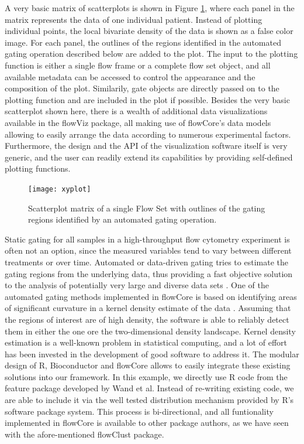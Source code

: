 \documentclass[12pt]{article}
\begin{document}
A very basic matrix of scatterplots is shown in Figure \ref{xyplot},
where each panel in the matrix represents the data of one individual
patient. Instead of plotting individual points, the local bivariate
density of the data is shown as a false color image. For each panel,
the outlines of the regions identified in the automated gating
operation described below are added to the plot. The input to the
plotting function is either a single flow frame or a complete flow set
object, and all available metadata can be accessed to control the
appearance and the composition of the plot. Similarily, gate objects
are directly passed on to the plotting function and are included in
the plot if possible. Besides the very basic scatterplot shown here,
there is a wealth of additional data visualizations available in the
flowViz package\cite{sarkar2008ufv}, all making use of flowCore's data
models allowing to easily arrange the data according to numerous
experimental factors. Furthermore, the design and the API of the
visualization software itself is very generic, and the user can
readily extend its capabilities by providing self-defined plotting
functions.

\begin{figure}[htbp]
\centering
\texttt{[image: xyplot]}
\caption{\label{xyplot}%
Scatterplot matrix of a single Flow Set with outlines of the gating
regions identified by an automated gating operation.}
\end{figure}

Static gating for all samples in a high-throughput flow cytometry
experiment is often not an option, since the measured variables tend
to vary between different treatments or over time. Automated or
data-driven gating tries to estimate the gating regions from the
underlying data, thus providing a fast objective solution to the
analysis of potentially very large and diverse data sets
\cite{lo2008agf}. One of the automated gating methods implemented in
flowCore is based on identifying areas of significant curvature in a
kernel density estimate of the data \citep{wand2008}. Assuming that
the regions of interest are of high density, the software is able to
reliably detect them in either the one ore the two-dimensional density
landscape. Kernel density estimation is a well-known problem in
statistical computing, and a lot of effort has been invested in the
development of good software to address it. The modular design of R,
Bioconductor and flowCore allows to easily integrate these existing
solutions into our framework. In this example, we directly use R code
from the feature package developed by Wand et al. Instead of
re-writing existing code, we are able to include it via the well
tested distribution mechanism provided by R's software package
system. This process is bi-directional, and all funtionality
implemented in flowCore is available to other package authors, as we
have seen with the afore-mentioned flowClust package.
\end{document}
